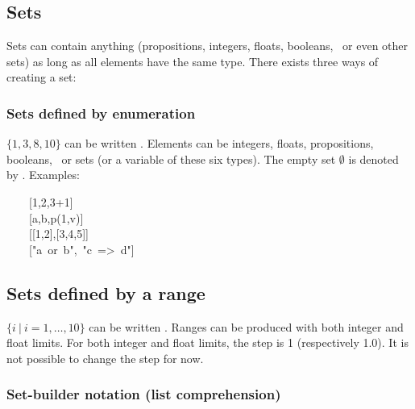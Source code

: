 {\subsection{Sets}\label{sec-sets}%

\noindent Sets can contain anything (propositions, integers, floats,
booleans,~ or even other sets) as long
as all elements have the same type. There exists three ways of creating a
set:%

\subsubsection{Sets defined by enumeration}\label{sec-sets-defined-by-enumeration}%

\noindent$\{1,3,8,10\}$ can be written . Elements can be integers,
floats, propositions, booleans,~ or
sets (or a variable of these six types). The empty set $\emptyset$ is
denoted by \mdcode{{}[]}. Examples:%
\begin{mdpre}%
\noindent~~~~{}[{1},{2},{3}+{1}]\\
~~~~{}[a,b,p({1},v)]\\
~~~~{}[{}[{1},{2}],{}[{3},{4},{5}]]\\
~~~~{}["a~or~b",~"c~=\textgreater{}~d"]%
\end{mdpre}
\subsection{Sets defined by a range}\label{sec-sets-defined-by-a-range}%

\noindent$\{i~|~i=1,\dots,10\}$ can be written . Ranges can
be produced with both integer and float limits. For both integer and float
limits, the step is 1 (respectively 1.0). It is not possible to change the step for now.%

\subsubsection{Set-builder notation (list comprehension)}\label{set-builder}%

}
